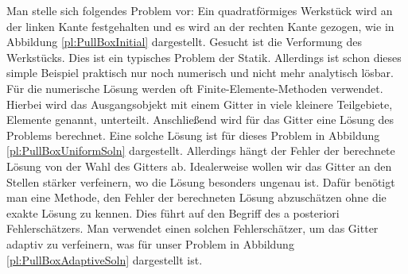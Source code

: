 \documentclass{scrartcl}
\begin{document}
Man stelle sich folgendes Problem vor: Ein quadratförmiges Werkstück wird an der linken Kante festgehalten und es wird an der rechten Kante gezogen, wie in Abbildung \ref{pl:PullBoxInitial} dargestellt. Gesucht ist die Verformung des Werk\-stücks.
Dies ist ein typisches Problem der Statik. Allerdings ist schon dieses simple Beispiel praktisch nur noch numerisch und nicht mehr analytisch lösbar. Für die numerische Lösung werden oft Finite-Elemente-Methoden verwendet. Hierbei wird das Ausgangsobjekt mit einem Gitter in viele kleinere Teilgebiete, Elemente genannt, unterteilt. Anschließend wird für das Gitter eine Lösung des Problems berechnet. Eine solche Lösung ist für dieses Problem in Abbildung \ref{pl:PullBoxUniformSoln} dargestellt. Allerdings hängt der Fehler der berechnete Lösung von der Wahl des Gitters ab. Idealerweise wollen wir das Gitter an den Stellen stärker verfeinern, wo die Lösung besonders ungenau ist. Dafür benötigt man eine Methode, den Fehler der berechneten Lösung abzuschätzen ohne die exakte Lösung zu kennen. Dies führt auf den Begriff des a posteriori Fehlerschätzers. Man verwendet einen solchen Fehlerschätzer, um das Gitter adaptiv zu verfeinern, was für unser Problem in Abbildung \ref{pl:PullBoxAdaptiveSoln} dargestellt ist.
\end{document}

